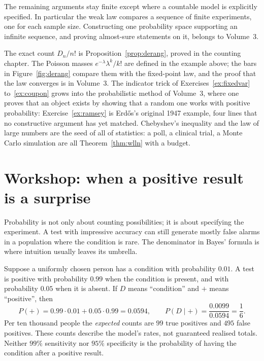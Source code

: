 The remaining arguments stay finite except where a countable model is explicitly
specified. In particular the weak law compares a sequence of finite experiments,
one for each sample size. Constructing one probability space supporting an
infinite sequence, and proving almost-sure statements on it, belongs to Volume~3.

\begin{beauty}
The exact count $D_n/n!$ is Proposition~\ref{prop:derang}, proved in the counting chapter. The Poisson masses $e^{-\lambda}\lambda^k/k!$ are defined in the example above; the bars in Figure~\ref{fig:derang} compare them with the fixed-point law, and the proof that the law converges is in Volume~3. The indicator trick of Exercises~\ref{ex:fixedvar} to~\ref{ex:coupon} grows into the probabilistic
method of Volume~3, where one proves that an object exists by showing that a random one works with positive probability: Exercise~\ref{ex:ramsey} is Erd\H os's original 1947 example, four lines that no constructive argument has yet matched. Chebyshev's inequality and the law of large numbers are the seed of all of statistics: a poll, a clinical trial, a Monte Carlo simulation are all Theorem~\ref{thm:wlln} with a budget.
\end{beauty}


\section{Workshop: when a positive result is a surprise}
Probability is not only about counting possibilities; it is about specifying the experiment. A test with impressive accuracy can still generate mostly false alarms in a population where the condition is rare. The denominator in Bayes' formula is where intuition usually leaves its umbrella.

\begin{examplex}
Suppose a uniformly chosen person has a condition with probability $0.01$. A test is positive with probability $0.99$ when the condition is present, and with probability $0.05$ when it is absent. If $D$ means ``condition'' and $+$ means ``positive'', then
\[
P(+)=0.99\cdot0.01+0.05\cdot0.99=0.0594,
\qquad P(D\mid+)=\frac{0.0099}{0.0594}=\frac16.
\]
Per ten thousand people the \emph{expected} counts are $99$ true positives and $495$ false positives. These counts describe the model's rates, not guaranteed realised totals. Neither $99\%$ sensitivity nor $95\%$ specificity is the probability of having the condition after a positive result.
\end{examplex}

